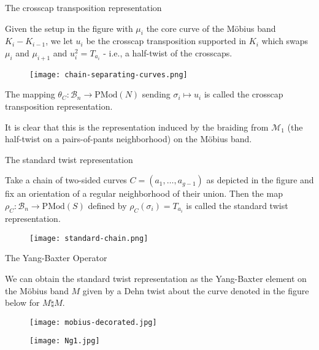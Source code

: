 \documentclass{beamer}
\theoremstyle{definition}
\theoremstyle{remark}
\newcommand{\PMod}{{\mathrm{PMod}}}
\begin{document}
\begin{frame}{The crosscap transposition representation}

Given the setup in the figure with
$\mu_i$ the core
curve of the Möbius band
$K_i - K_{i-1}$, we
let $u_i$ be the crosscap transposition
supported in $K_i$ which
swaps $\mu_i$ and $\mu_{i+1}$ and
$u_i^2 = T_{a_i}$ - i.e., a
half-twist of the crosscaps.

    \begin{figure}
        \centering
        \texttt{[image: chain-separating-curves.png]}
        \label{fig:enter-label}
    \end{figure}

The mapping $\theta_C \colon
\mathcal{B}_n \to 
\PMod(N)$ sending $\sigma_i \mapsto
u_i$ is called the crosscap transposition representation.

It is clear that this is the representation induced by the braiding from $\mathcal{M}_1$ (the half-twist on a pairs-of-pants neighborhood) on the Möbius band.
\end{frame}

\begin{frame}{The standard twist representation}

Take a chain of two-sided curves
$C = (a_1, \ldots , a_{g-1})$ as
depicted in the figure and fix
an orientation of a regular neighborhood
of their union.
Then the map
$\rho_C \colon \mathcal{B}_n 
\to \PMod(S)$ defined by
$\rho_C (\sigma_i) = T_{a_i}$
is called the standard twist representation.

\begin{figure}
    \centering
    \texttt{[image: standard-chain.png]}
    \label{fig:enter-label}
\end{figure}
    
\end{frame}


\begin{frame}{The Yang-Baxter Operator}

We can obtain the standard twist representation as the Yang-Baxter element on the Möbius band $M$ given by
a Dehn twist about the
curve denoted in the figure
below for $M \natural M$.

\begin{figure}[H]
    \centering
    \begin{minipage}[b]{0.5\textwidth}
        \centering
        \texttt{[image: mobius-decorated.jpg]} %
    \end{minipage}\hfill
    \begin{minipage}[b]{0.5\textwidth}
        \centering
        \texttt{[image: Ng1.jpg]} %
    \end{minipage}
\end{figure}
\end{frame}
\end{document}
